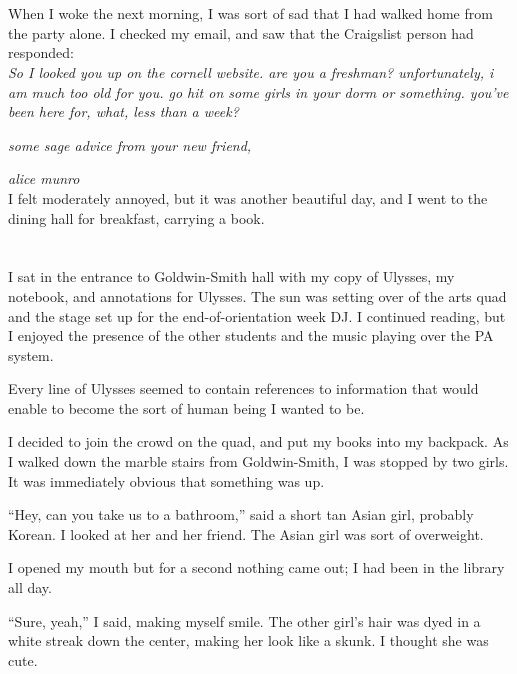 \section{}

When I woke the next morning, I was sort of sad that I had walked home from the
party alone.  I checked my email, and saw that the Craigslist person had
responded: \\

\textit{
So I looked you up on the cornell website. are you a freshman? unfortunately, i
am much too old for you. go hit on some girls in your dorm or something. you've
been here for, what, less than a week?}

\textit{some sage advice from your new friend,}

\textit{alice munro}\\

I felt moderately annoyed, but it was another beautiful day, and I went to the
dining hall for breakfast, carrying a book.  

\section{}

I sat in the entrance to Goldwin-Smith hall with my copy of Ulysses, my
notebook, and annotations for Ulysses.  The sun was setting over of the arts
quad and the stage set up for the end-of-orientation week DJ. I continued
reading,  but I enjoyed the presence of the other students and the music
playing over the PA system.

Every line of Ulysses seemed to contain references to information that would
enable to become the sort of human being I wanted to be.  

I decided to join the crowd on the quad, and put my books into my backpack.  As
I walked down the marble stairs from Goldwin-Smith, I was stopped by two girls.
It was immediately obvious that something was up.

``Hey, can you take us to a bathroom,'' said a short tan Asian girl, probably
Korean.  I looked at her and her friend.  The Asian girl was sort of overweight.

I opened my mouth but for a second nothing came out; I had been in the library
all day.

``Sure, yeah,'' I said, making myself smile.  The other girl's hair was dyed in
a white streak down the center, making her look like a skunk.  I thought she
was cute.

